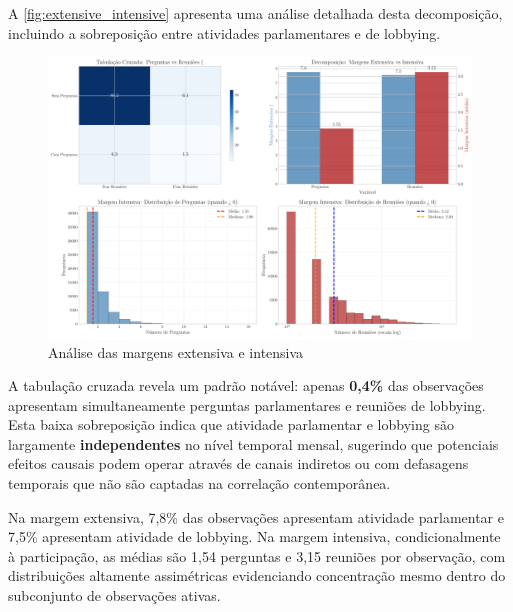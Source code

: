 A \autoref{fig:extensive_intensive} apresenta uma análise detalhada desta decomposição, incluindo a sobreposição entre atividades parlamentares e de lobbying.

\begin{figure}[htbp]
\centering
\includegraphics[width=\textwidth]{figures/fig5_extensive_intensive_margins.pdf}
\caption{Análise das margens extensiva e intensiva}
\label{fig:extensive_intensive}
\end{figure}

A tabulação cruzada revela um padrão notável: apenas \textbf{0,4\%} das observações apresentam simultaneamente perguntas parlamentares e reuniões de lobbying. Esta baixa sobreposição indica que atividade parlamentar e lobbying são largamente \textbf{independentes} no nível temporal mensal, sugerindo que potenciais efeitos causais podem operar através de canais indiretos ou com defasagens temporais que não são captadas na correlação contemporânea.

Na margem extensiva, 7,8\% das observações apresentam atividade parlamentar e 7,5\% apresentam atividade de lobbying. Na margem intensiva, condicionalmente à participação, as médias são 1,54 perguntas e 3,15 reuniões por observação, com distribuições altamente assimétricas evidenciando concentração mesmo dentro do subconjunto de observações ativas.

